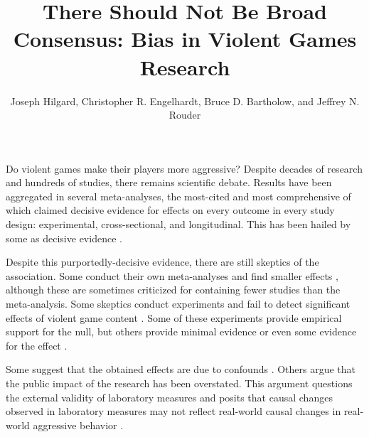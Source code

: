 \documentclass[man]{apa6}
\author{Joseph Hilgard, Christopher R. Engelhardt, Bruce D. Bartholow, and Jeffrey N. Rouder}
\title{There Should Not Be Broad Consensus: Bias in Violent Games Research}
\affiliation{University of Missouri}
\begin{document}
\maketitle

Do violent games make their players more aggressive? Despite decades of research and hundreds of studies, there remains scientific debate. Results have been aggregated in several meta-analyses, the most-cited and most comprehensive of which \citep{Anderson:etal:2010} claimed decisive evidence for effects on every outcome in every study design: experimental, cross-sectional, and longitudinal. 
This has been hailed by some as decisive evidence \citep{Bushman:etal:2010,Huesmann:2010,Huesmann:2014}.


Despite this purportedly-decisive evidence, there are still skeptics of the association.
Some conduct their own meta-analyses and find smaller effects \citep{Ferguson:2007a,Ferguson:2007b,Ferguson:InPress,Sherry:2001}, although these are sometimes criticized for containing fewer studies than the \citet{Anderson:etal:2010} meta-analysis. %
Some skeptics conduct experiments and fail to detect significant effects of violent game content \citep{Adachi:Willoughby:2011,Elson:etal:2013,Ferguson:etal:2008,Valadez:Ferguson:2012}. Some of these experiments provide empirical support for the null, but others provide minimal evidence or even some evidence for the effect \citep{Hilgard:etal:2014}.

Some suggest that the obtained effects are due to confounds \citep{Adachi:Willoughby:2011b;Elson:etal:2013}. Others argue that the public impact of the research has been overstated. This argument questions the external validity of laboratory measures and posits that causal changes observed in laboratory measures may not reflect real-world causal changes in real-world aggressive behavior \citep{Elson:Ferguson:2014}. %
\end{document}
